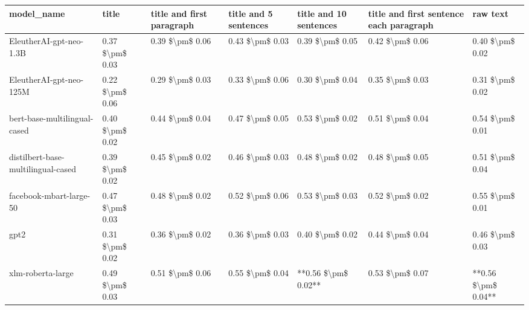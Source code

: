 \begin{tabular}{lllllll}
\toprule
                        model\_name &           title & title and first paragraph & title and 5 sentences & title and 10 sentences & title and first sentence each paragraph &            raw text \\
\midrule
           EleutherAI-gpt-neo-1.3B & 0.37 \$\textbackslash pm\$ 0.03 &           0.39 \$\textbackslash pm\$ 0.06 &       0.43 \$\textbackslash pm\$ 0.03 &        0.39 \$\textbackslash pm\$ 0.05 &                         0.42 \$\textbackslash pm\$ 0.06 &     0.40 \$\textbackslash pm\$ 0.02 \\
           EleutherAI-gpt-neo-125M & 0.22 \$\textbackslash pm\$ 0.06 &           0.29 \$\textbackslash pm\$ 0.03 &       0.33 \$\textbackslash pm\$ 0.06 &        0.30 \$\textbackslash pm\$ 0.04 &                         0.35 \$\textbackslash pm\$ 0.03 &     0.31 \$\textbackslash pm\$ 0.02 \\
      bert-base-multilingual-cased & 0.40 \$\textbackslash pm\$ 0.02 &           0.44 \$\textbackslash pm\$ 0.04 &       0.47 \$\textbackslash pm\$ 0.05 &        0.53 \$\textbackslash pm\$ 0.02 &                         0.51 \$\textbackslash pm\$ 0.04 &     0.54 \$\textbackslash pm\$ 0.01 \\
distilbert-base-multilingual-cased & 0.39 \$\textbackslash pm\$ 0.02 &           0.45 \$\textbackslash pm\$ 0.02 &       0.46 \$\textbackslash pm\$ 0.03 &        0.48 \$\textbackslash pm\$ 0.02 &                         0.48 \$\textbackslash pm\$ 0.05 &     0.51 \$\textbackslash pm\$ 0.04 \\
           facebook-mbart-large-50 & 0.47 \$\textbackslash pm\$ 0.03 &           0.48 \$\textbackslash pm\$ 0.02 &       0.52 \$\textbackslash pm\$ 0.06 &        0.53 \$\textbackslash pm\$ 0.03 &                         0.52 \$\textbackslash pm\$ 0.02 &     0.55 \$\textbackslash pm\$ 0.01 \\
                              gpt2 & 0.31 \$\textbackslash pm\$ 0.02 &           0.36 \$\textbackslash pm\$ 0.02 &       0.36 \$\textbackslash pm\$ 0.03 &        0.40 \$\textbackslash pm\$ 0.02 &                         0.44 \$\textbackslash pm\$ 0.04 &     0.46 \$\textbackslash pm\$ 0.03 \\
                 xlm-roberta-large & 0.49 \$\textbackslash pm\$ 0.03 &           0.51 \$\textbackslash pm\$ 0.06 &       0.55 \$\textbackslash pm\$ 0.04 &    **0.56 \$\textbackslash pm\$ 0.02** &                         0.53 \$\textbackslash pm\$ 0.07 & **0.56 \$\textbackslash pm\$ 0.04** \\
\bottomrule
\end{tabular}
